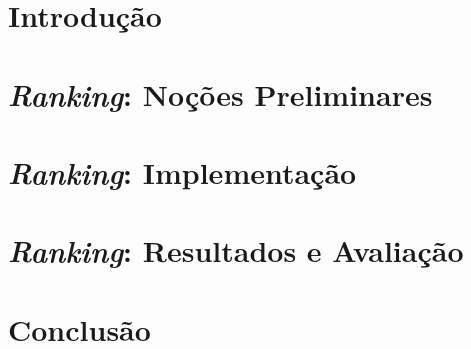 \documentclass[12pt, a4paper, normaltoc, capchap, capsec, times]{abnt}
\begin{document}
\ProximoForaDoSumario
\listadetabelas


\chapter{Introdução}
\label{chap:introducao}


\chapter{\emph{Ranking}: Noções Preliminares}
\label{chap:nocoes_preliminares}


\chapter{\emph{Ranking}: Implementação}
\label{chap:implementacao}


\chapter{\emph{Ranking}: Resultados e Avaliação}
\label{chap:avaliacao}


\chapter{Conclusão}
\label{chap:conclusao}



\end{document}
